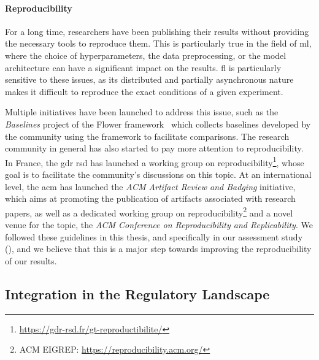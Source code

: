 \paragraph{Reproducibility}

For a long time, researchers have been publishing their results without providing the necessary tools to reproduce them.
This is particularly true in the field of \gls{ml}, where the choice of hyperparameters, the data preprocessing, or the model architecture can have a significant impact on the results.
\Gls{fl} is particularly sensitive to these issues, as its distributed and partially asynchronous nature makes it difficult to reproduce the exact conditions of a given experiment.

Multiple initiatives have been launched to address this issue, such as the \emph{Baselines} project of the Flower framework~\cite{beutel_Flowerfriendlyfederated_2020} which collects baselines developed by the community using the framework to facilitate comparisons.
The research community in general has also started to pay more attention to reproducibility.
In France, the \gls{gdr} \gls{rsd} has launched a working group on reproducibility\footnote{\url{https://gdr-rsd.fr/gt-reproductibilite/}}, whose goal is to facilitate the community's discussions on this topic.
At an international level, the \gls{acm} has launched the \emph{ACM Artifact Review and Badging} initiative, which aims at promoting the publication of artifacts associated with research papers, as well as a dedicated working group on reproducibility\footnote{ACM EIGREP: \url{https://reproducibility.acm.org/}} and a novel venue for the topic, the \emph{ACM Conference on Reproducibility and Replicability}.
We followed these guidelines in this thesis, and specifically in our assessment study (), and we believe that this is a major step towards improving the reproducibility of our results.


\subsection{Integration in the Regulatory Landscape\label{sec:conclusion.perspectives.regulations}}


